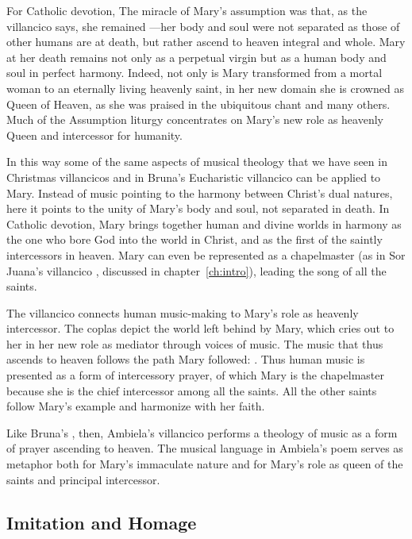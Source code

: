 For Catholic devotion, The miracle of Mary's assumption was that, as the villancico says, she remained ---her body and soul were not separated as those of other humans are at death, but rather ascend to heaven integral and whole.
Mary at her death remains  not only as a perpetual virgin but as a human body and soul in perfect harmony.
Indeed, not only is Mary transformed from a mortal woman to an eternally living heavenly saint, in her new domain she is crowned as Queen of Heaven, as she was praised in the ubiquitous  chant and many others.
Much of the Assumption liturgy concentrates on Mary's new role as heavenly Queen and intercessor for humanity.

In this way some of the same aspects of musical theology that we have seen in Christmas villancicos and in Bruna's Eucharistic villancico can be applied to Mary.
Instead of music pointing to the harmony between Christ's dual natures, here it points to the unity of Mary's body and soul, not separated in death.
In Catholic devotion, Mary brings together human and divine worlds in harmony as the one who bore God into the world in Christ, and as the first of the saintly intercessors in heaven.
Mary can even be represented as a chapelmaster (as in Sor Juana's villancico , discussed in chapter~\ref{ch:intro}), leading the song of all the saints.

The villancico connects human music-making to Mary's role as heavenly intercessor.
The coplas depict the world left behind by Mary, which cries out to her in her new role as mediator through voices of music.
The music that thus ascends to heaven follows the path Mary followed: .
Thus human music is presented as a form of intercessory prayer, of which Mary is the chapelmaster because she is the chief intercessor among all the saints.
All the other saints follow Mary's example and harmonize with her faith.

Like Bruna's , then, Ambiela's villancico performs a theology of music as a form of prayer ascending to heaven.
The musical language in Ambiela's poem serves as metaphor both for Mary's immaculate nature and for Mary's role as queen of the saints and principal intercessor.

\subsection{Imitation and Homage}

